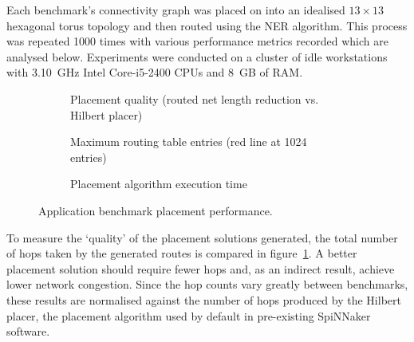 				Each benchmark's connectivity graph was placed on into an idealised $13
				\times 13$ hexagonal torus topology and then routed using the NER
				algorithm. This process was repeated \num{1000} times with various
				performance metrics recorded which are analysed below. Experiments were
				conducted on a cluster of idle workstations with 3.10~GHz Intel
				Core-i5-2400 CPUs and 8~GB of RAM.
			
				\begin{figure}
					\center
					\begin{subfigure}{\linewidth}
						\center
						
						\caption{Placement quality (routed net length reduction vs. Hilbert
						placer)}
						\label{fig:application-benchmarks-quality}
					\end{subfigure}
					
					\vspace*{1em}
					
					\begin{subfigure}{\linewidth}
						\center
						
						\caption{Maximum routing table entries (red line at \num{1024} entries)}
						\label{fig:application-benchmarks-tables}
					\end{subfigure}
					
					\vspace*{1em}
					
					\begin{subfigure}{\linewidth}
						\center
						
						\caption{Placement algorithm execution time}
						\label{fig:application-benchmarks-runtime}
					\end{subfigure}
					
					\caption{Application benchmark placement performance.}
					\label{fig:application-benchmarks}
				\end{figure}
				
				To measure the `quality' of the placement solutions generated, the
				total number of hops taken by the generated routes is compared in
				figure~\ref{fig:application-benchmarks-quality}. A better placement
				solution should require fewer hops and, as an indirect result, achieve
				lower network congestion.  Since the hop counts vary greatly between
				benchmarks, these results are normalised against the number of hops
				produced by the Hilbert placer, the placement algorithm used by default
				in pre-existing SpiNNaker software.
				
